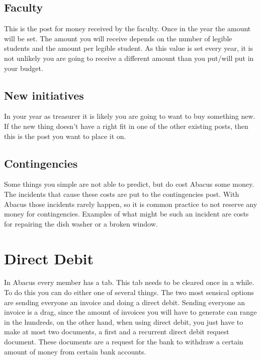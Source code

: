 \documentclass{report}
\begin{document}
\subsection{Faculty}
This is the post for money received by the faculty. Once in the year the amount will be set. The amount you will receive depends on the number of legible students and the amount per legible student. As this value is set every year, it is not unlikely you are going to receive a different amount than you put/will put in your budget.
\subsection{New initiatives}
In your year as treasurer it is likely you are going to want to buy something new. If the new thing doesn't have a right fit in one of the other existing posts, then this is the post you want to place it on.
\subsection{Contingencies}
Some things you simple are not able to predict, but do cost Abacus some money. The incidents that cause these costs are put to the contingencies post. With Abacus those incidents rarely happen, so it is common practice to not reserve any money for contingencies. Examples of what might be such an incident are costs for repairing the dish washer or a broken window.
\section{Direct Debit}
In Abacus every member has a tab. This tab needs to be cleared once in a while. To do this you can do either one of several things. The two most sensical options are sending everyone an invoice and doing a direct debit. Sending everyone an invoice is a drag, since the amount of invoices you will have to generate can range in the hundreds, on the other hand, when using direct debit, you just have to make at most two documents, a first and a recurrent direct debit request document. These documents are a request for the bank to withdraw a certain amount of money from certain bank accounts.
\end{document}
